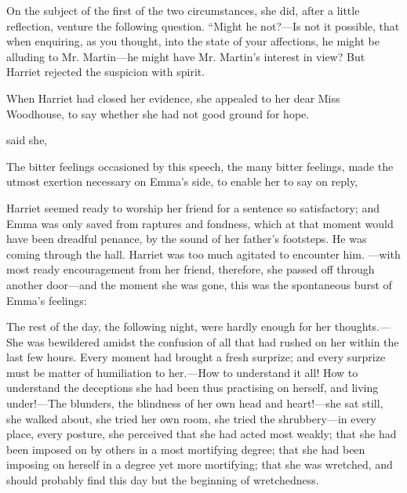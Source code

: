 On the subject of the first of the two circumstances, she did, after a little reflection, venture the following question. “Might he not?---Is not it possible, that when enquiring, as you thought, into the state of your affections, he might be alluding to Mr. Martin---he might have Mr. Martin's interest in view? But Harriet rejected the suspicion with spirit.


When Harriet had closed her evidence, she appealed to her dear Miss Woodhouse, to say whether she had not good ground for hope.

 said she, 

The bitter feelings occasioned by this speech, the many bitter feelings, made the utmost exertion necessary on Emma's side, to enable her to say on reply,


Harriet seemed ready to worship her friend for a sentence so satisfactory; and Emma was only saved from raptures and fondness, which at that moment would have been dreadful penance, by the sound of her father's footsteps. He was coming through the hall. Harriet was too much agitated to encounter him. ---with most ready encouragement from her friend, therefore, she passed off through another door---and the moment she was gone, this was the spontaneous burst of Emma's feelings: 

The rest of the day, the following night, were hardly enough for her thoughts.---She was bewildered amidst the confusion of all that had rushed on her within the last few hours. Every moment had brought a fresh surprize; and every surprize must be matter of humiliation to her.---How to understand it all! How to understand the deceptions she had been thus practising on herself, and living under!---The blunders, the blindness of her own head and heart!---she sat still, she walked about, she tried her own room, she tried the shrubbery---in every place, every posture, she perceived that she had acted most weakly; that she had been imposed on by others in a most mortifying degree; that she had been imposing on herself in a degree yet more mortifying; that she was wretched, and should probably find this day but the beginning of wretchedness.


